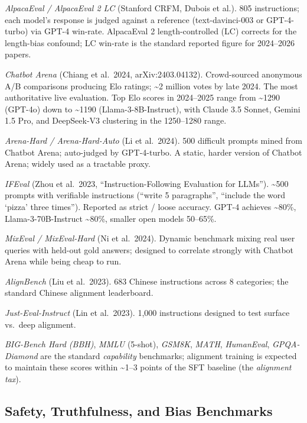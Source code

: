 \emph{AlpacaEval / AlpacaEval 2 LC} (Stanford CRFM, Dubois et al.). 805 instructions; each model's response is judged against a reference (text-davinci-003 or GPT-4-turbo) via GPT-4 win-rate. AlpacaEval 2 length-controlled (LC) corrects for the length-bias confound; LC win-rate is the standard reported figure for 2024--2026 papers.

\emph{Chatbot Arena} (Chiang et al.~2024, arXiv:2403.04132). Crowd-sourced anonymous A/B comparisons producing Elo ratings; \textasciitilde2 million votes by late 2024. The most authoritative live evaluation. Top Elo scores in 2024--2025 range from \textasciitilde1290 (GPT-4o) down to \textasciitilde1190 (Llama-3-8B-Instruct), with Claude 3.5 Sonnet, Gemini 1.5 Pro, and DeepSeek-V3 clustering in the 1250--1280 range.

\emph{Arena-Hard / Arena-Hard-Auto} (Li et al.~2024). 500 difficult prompts mined from Chatbot Arena; auto-judged by GPT-4-turbo. A static, harder version of Chatbot Arena; widely used as a tractable proxy.

\emph{IFEval} (Zhou et al.~2023, ``Instruction-Following Evaluation for LLMs''). \textasciitilde500 prompts with verifiable instructions (``write 5 paragraphs'', ``include the word `pizza' three times''). Reported as strict / loose accuracy. GPT-4 achieves \textasciitilde80\%, Llama-3-70B-Instruct \textasciitilde80\%, smaller open models 50--65\%.

\emph{MixEval / MixEval-Hard} (Ni et al.~2024). Dynamic benchmark mixing real user queries with held-out gold answers; designed to correlate strongly with Chatbot Arena while being cheap to run.

\emph{AlignBench} (Liu et al.~2023). 683 Chinese instructions across 8 categories; the standard Chinese alignment leaderboard.

\emph{Just-Eval-Instruct} (Lin et al.~2023). 1,000 instructions designed to test surface vs.~deep alignment.

\emph{BIG-Bench Hard (BBH)}, \emph{MMLU} (5-shot), \emph{GSM8K}, \emph{MATH}, \emph{HumanEval}, \emph{GPQA-Diamond} are the standard \emph{capability} benchmarks; alignment training is expected to maintain these scores within \textasciitilde1--3 points of the SFT baseline (the \emph{alignment tax}).

\subsection{Safety, Truthfulness, and Bias Benchmarks}\label{safety-truthfulness-and-bias-benchmarks}

